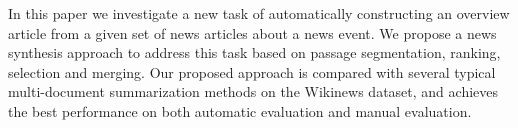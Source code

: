 In this paper we investigate a new task of automatically constructing an overview article from a given set of news articles about a news event. We propose a news synthesis approach to address this task based on passage segmentation, ranking, selection and merging. Our proposed approach is compared with several typical multi-document summarization methods on the Wikinews dataset, and achieves the best performance on both automatic evaluation and manual evaluation.
